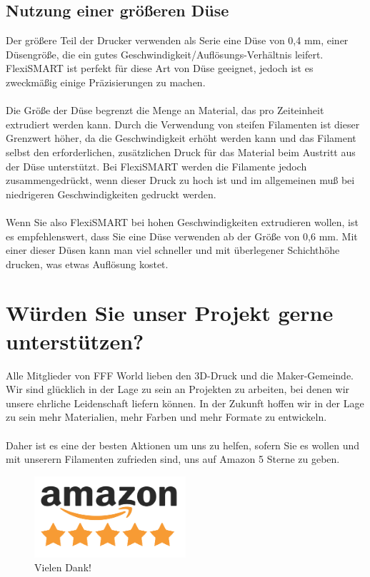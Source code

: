\documentclass[11pt,a4paper]{article}
\begin{document}
	\subsection{Nutzung einer größeren Düse}
Der größere Teil der Drucker verwenden als Serie eine Düse von 0,4 mm, einer Düsengröße, die ein gutes Geschwindigkeit/Auflösungs-Verhältnis leifert. FlexiSMART ist perfekt für diese Art von Düse geeignet, jedoch ist es zweckmäßig einige Präzisierungen zu machen.
\\\\
Die Größe der Düse begrenzt die Menge an Material, das pro Zeiteinheit extrudiert werden kann. Durch die Verwendung von steifen Filamenten ist dieser Grenzwert höher, da die Geschwindigkeit erhöht werden kann und das Filament selbst den erforderlichen, zusätzlichen Druck für das Material beim Austritt aus der Düse unterstützt. Bei FlexiSMART werden die Filamente jedoch zusammengedrückt, wenn dieser Druck zu hoch ist und im allgemeinen muß bei niedrigeren Geschwindigkeiten gedruckt werden.
\\\\
Wenn Sie also FlexiSMART bei hohen Geschwindigkeiten extrudieren wollen, ist es empfehlenswert, dass Sie eine Düse verwenden ab der Größe von 0,6 mm. Mit einer dieser Düsen kann man viel schneller und mit überlegener Schichthöhe drucken, was etwas Auflösung kostet.
\section{Würden Sie unser Projekt gerne unterstützen?}
Alle Mitglieder von FFF World lieben den 3D-Druck und die Maker-Gemeinde. Wir sind glücklich in der Lage zu sein an Projekten zu arbeiten, bei denen wir unsere ehrliche Leidenschaft liefern können. In der Zukunft hoffen wir in der Lage zu sein mehr Materialien, mehr Farben und mehr Formate zu entwickeln.
\\\\
Daher ist es eine der besten Aktionen um uns zu helfen, sofern Sie es wollen und mit unserern Filamenten zufrieden sind, uns auf Amazon 5 Sterne zu geben.
\begin{figure}[H]
\centering
\includegraphics[width=0.5\textwidth,cfbox=azul_marcos 1pt 0pt]{FOTOS/AMAZON_FIVE_STARS}
\caption*{Vielen Dank!}
\end{figure}
\end{document}
